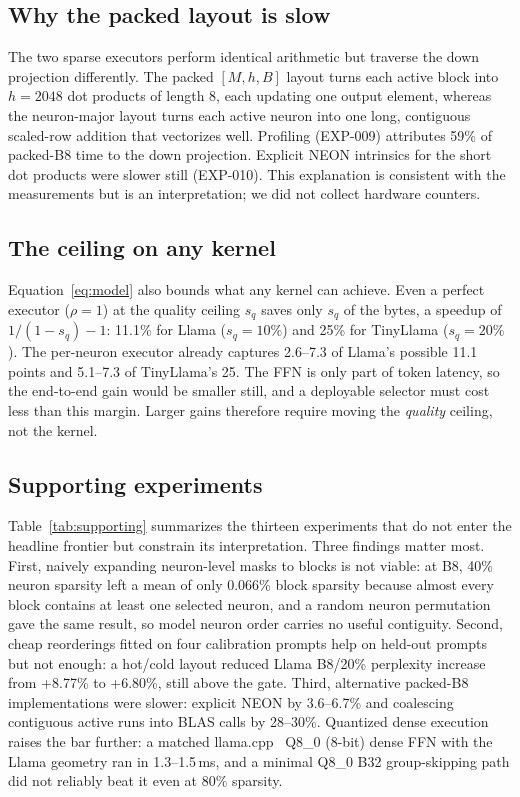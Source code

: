 \subsection{Why the packed layout is slow}

The two sparse executors perform identical arithmetic but traverse the down
projection differently. The packed $[M,h,B]$ layout turns each active block
into $h=2048$ dot products of length 8, each updating one output element,
whereas the neuron-major layout turns each active neuron into one long,
contiguous scaled-row addition that vectorizes well. Profiling (EXP-009)
attributes 59\% of packed-B8 time to the down projection. Explicit NEON
intrinsics for the short dot products were slower still (EXP-010). This
explanation is consistent with the measurements but is an interpretation; we
did not collect hardware counters.

\subsection{The ceiling on any kernel}

Equation~\ref{eq:model} also bounds what any kernel can achieve. Even a perfect
executor ($\rho=1$) at the quality ceiling $s_q$ saves only $s_q$ of the
bytes, a speedup of $1/(1-s_q)-1$: 11.1\% for Llama ($s_q=10\%$) and 25\% for
TinyLlama ($s_q=20\%$). The per-neuron executor already captures 2.6--7.3 of
Llama's possible 11.1 points and 5.1--7.3 of TinyLlama's 25. The FFN is only
part of token latency, so the end-to-end gain would be smaller still, and a
deployable selector must cost less than this margin. Larger gains therefore
require moving the \emph{quality} ceiling, not the kernel.

\subsection{Supporting experiments}
\label{sec:supporting}

Table~\ref{tab:supporting} summarizes the thirteen experiments that do not
enter the headline frontier but constrain its interpretation. Three findings
matter most. First, naively expanding neuron-level masks to blocks is not
viable: at B8, 40\% neuron sparsity left a mean of only 0.066\% block sparsity
because almost every block contains at least one selected neuron, and a random
neuron permutation gave the same result, so model neuron order carries no
useful contiguity. Second, cheap reorderings fitted on four calibration
prompts help on held-out prompts but not enough: a hot/cold layout reduced
Llama B8/20\% perplexity increase from +8.77\% to +6.80\%, still above the
gate. Third, alternative packed-B8 implementations were slower: explicit NEON
by 3.6--6.7\% and coalescing contiguous active runs into BLAS calls by
28--30\%. Quantized dense execution raises the bar further: a matched
llama.cpp~\cite{llamacpp} Q8\_0 (8-bit) dense FFN with the Llama geometry ran
in 1.3--1.5\,ms, and a minimal Q8\_0 B32 group-skipping path did not
reliably beat it even at 80\% sparsity.

